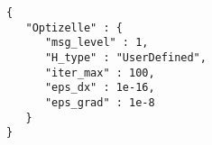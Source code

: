 \begin{lstlisting}[style=json,caption={Optizelle uses this input specification to minimize the equality constrained problem specified in Listing \ref{lst:simpleEq}.  We explain this specification Chapter \ref{ch:Input}.},label=lst:simpleEqJSON]
{
   "Optizelle" : {
      "msg_level" : 1,
      "H_type" : "UserDefined",
      "iter_max" : 100,
      "eps_dx" : 1e-16,
      "eps_grad" : 1e-8
   }
}
\end{lstlisting}
